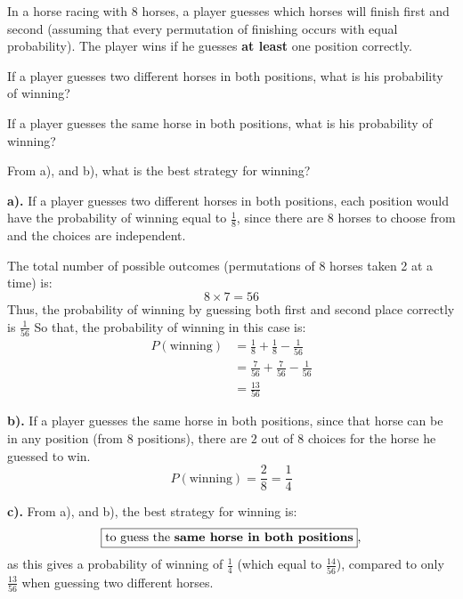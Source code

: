 \documentclass[a4paper, 10pt]{article}
\begin{document}
\begin{problem}
In a horse racing with 8 horses, a player guesses which horses will finish first
and second (assuming that every permutation of finishing occurs with equal probability).
The player wins if he guesses \textbf{at least} one position correctly.
\begin{subproblems}
    \item If a player guesses two different horses in both positions, what is his probability of winning?
    \item If a player guesses the same horse in both positions, what is his probability of winning?
    \item From a), and b), what is the best strategy for winning?
\end{subproblems}
\end{problem}

\begin{solution}
\par\noindent\textbf{a).} If a player guesses two different horses in both positions,
each position would have the probability of winning equal to \( \frac{1}{8} \),
since there are 8 horses to choose from and the choices are independent.
\\
\par The total number of possible outcomes (permutations of 8 horses taken 2 at a time) is:
\[
8 \times 7 = 56
\]
Thus, the probability of winning by guessing both first and second place correctly is \( \frac{1}{56} \)
So that, the probability of winning in this case is:
\begin{align*}
    P(\text{winning}) &= \frac{1}{8} + \frac{1}{8} - \frac{1}{56} \\
    &= \frac{7}{56} + \frac{7}{56} - \frac{1}{56} \\
    &= \boxed{\frac{13}{56}}
\end{align*}

\par\noindent\textbf{b).} If a player guesses the same horse in both positions,
since that horse can be in any position (from \(8\) positions),
there are \(2\) out of \(8\) choices for the horse he guessed to win.
\[
P(\text{winning}) = \frac{2}{8} = \boxed{\frac{1}{4}}
\]

\par\noindent\textbf{c).} From a), and b), the best strategy for winning is:
\[
\boxed{\text{to guess the \textbf{same horse in both positions}}},
\]
as this gives a probability of winning of \(\frac{1}{4}\) (which equal to \(\frac{14}{56}\)),
compared to only \(\frac{13}{56}\) when guessing two different horses.
\end{solution}
\end{document}
